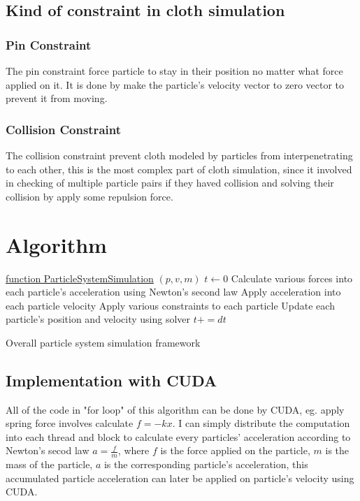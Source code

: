 \documentclass{article}
\begin{document}
	\subsection{Kind of constraint in cloth simulation}
	\subsubsection{Pin Constraint}
	The pin constraint force particle to stay in their position no matter what force applied on it. It is done by make the particle's velocity vector to zero vector to prevent it from moving.
	
	\subsubsection{Collision Constraint}
	The collision constraint prevent cloth modeled by particles from interpenetrating to each other, this is the most complex part of cloth simulation, since it involved in  checking of multiple particle pairs if they haved collision and solving their collision by apply some repulsion force.
	\section{Algorithm}
\begin{algorithm}
	
	\underline{function ParticleSystemSimulation} $(p, v, m)$\;
	$t\gets 0$\;
	{
		Calculate various forces into each particle's acceleration using Newton's second law\;
		Apply acceleration into each particle velocity\;
		Apply various constraints to each particle\;
		Update each particle's position and velocity using solver\;
		$t  += dt$\;
	}
	\caption{Overall particle system simulation framework}
\end{algorithm}
	\subsection{Implementation with CUDA}
	All of the code in "for loop" of this algorithm can be done by CUDA, eg. apply spring force involves calculate $f=-kx$. I can simply distribute the computation into each thread and block to calculate every particles' acceleration according to Newton's secod law $a=\frac{f}{m}$, where $f$ is the force applied on the particle, $m$ is the mass of the particle, $a$ is the corresponding particle's acceleration, this accumulated particle acceleration can later be applied on particle's velocity using CUDA. 
	
\end{document}
